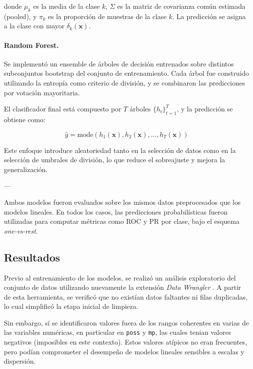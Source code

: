\documentclass[11pt]{article}
\begin{document}
donde $\mu_k$ es la media de la clase $k$, $\Sigma$ es la matriz de covarianza común estimada (pooled), y $\pi_k$ es la proporción de muestras de la clase $k$. La predicción se asigna a la clase con mayor $\delta_k(\mathbf{x})$.

\paragraph{Random Forest.}
Se implementó un ensemble de árboles de decisión entrenados sobre distintos subconjuntos bootstrap del conjunto de entrenamiento. Cada árbol fue construido utilizando la entropía como criterio de división, y se combinaron las predicciones por votación mayoritaria.

El clasificador final está compuesto por $T$ árboles $\{h_t\}_{t=1}^T$, y la predicción se obtiene como:

\[
\hat{y} = \text{mode} \left( h_1(\mathbf{x}), h_2(\mathbf{x}), \ldots, h_T(\mathbf{x}) \right)
\]

Este enfoque introduce aleatoriedad tanto en la selección de datos como en la selección de umbrales de división, lo que reduce el sobreajuste y mejora la generalización.

---

Ambos modelos fueron evaluados sobre los mismos datos preprocesados que los modelos lineales. En todos los casos, las predicciones probabilísticas fueron utilizadas para computar métricas como ROC y PR por clase, bajo el esquema \textit{one-vs-rest}.


\subsection{Resultados}

Previo al entrenamiento de los modelos, se realizó un análisis exploratorio del conjunto de datos utilizando nuevamente la extensión \textit{Data Wrangler} \cite{datawrangler2023}. A partir de esta herramienta, se verificó que no existían datos faltantes ni filas duplicadas, lo cual simplificó la etapa inicial de limpieza.

Sin embargo, sí se identificaron valores fuera de los rangos coherentes en varias de las variables numéricas, en particular en \texttt{poss} y \texttt{mp}, las cuales tenian valores negativos (imposibles en este contexto). Estos valores atípicos no eran frecuentes, pero podían comprometer el desempeño de modelos lineales sensibles a escalas y dispersión.
\end{document}
